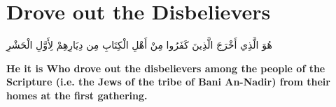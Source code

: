 \chapter{Drove out the Disbelievers}
\begin{center}
    {\Huge    
        \begin{Arabic}
            هُوَ الَّذِي أَخْرَجَ الَّذِينَ كَفَرُوا مِنْ أَهْلِ الْكِتَابِ مِن دِيَارِهِمْ لِأَوَّلِ الْحَشْرِ
        \end{Arabic}
    }
\end{center}
\vspace*{\fill}
\vspace{3cm}
\begin{center}
    \large \textbf{He it is Who drove out the disbelievers among the people of the Scripture (i.e. the Jews of the tribe of Bani An-Nadir) from their homes at the first gathering.}
\end{center}
